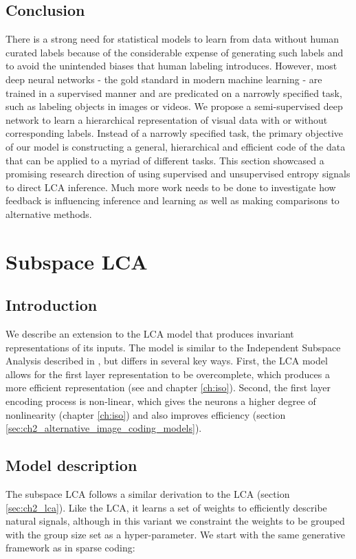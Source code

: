 \subsection{Conclusion}
There is a strong need for statistical models to learn from data without human curated labels because of the considerable expense of generating such labels and to avoid the unintended biases that human labeling introduces. However, most deep neural networks - the gold standard in modern machine learning - are trained in a supervised manner and are predicated on a narrowly specified task, such as labeling objects in images or videos. We propose a semi-supervised deep network to learn a hierarchical representation of visual data with or without corresponding labels. Instead of a narrowly specified task, the primary objective of our model is constructing a general, hierarchical and efficient code of the data that can be applied to a myriad of different tasks. This section showcased a promising research direction of using supervised and unsupervised entropy signals to direct LCA inference. Much more work needs to be done to investigate how feedback is influencing inference and learning as well as making comparisons to alternative methods.


\section{Subspace LCA}\label{sec:ch3_subspace_lca}
\subsection{Introduction}
We describe an extension to the LCA model that produces invariant representations of its inputs. The model is similar to the Independent Subspace Analysis described in \parencite{hyvarinen2000emergence}, but differs in several key ways. First, the LCA model allows for the first layer representation to be overcomplete, which produces a more efficient representation (see \parencite{lewicki2000learning} and chapter \ref{ch:iso}). Second, the first layer encoding process is non-linear, which gives the neurons a higher degree of nonlinearity (chapter \ref{ch:iso}) and also improves efficiency (section \ref{sec:ch2_alternative_image_coding_models}).

\subsection{Model description}
The subspace LCA follows a similar derivation to the LCA (section \ref{sec:ch2_lca}). Like the LCA, it learns a set of weights to efficiently describe natural signals, although in this variant we constraint the weights to be grouped with the group size set as a hyper-parameter. We start with the same generative framework as in sparse coding:


